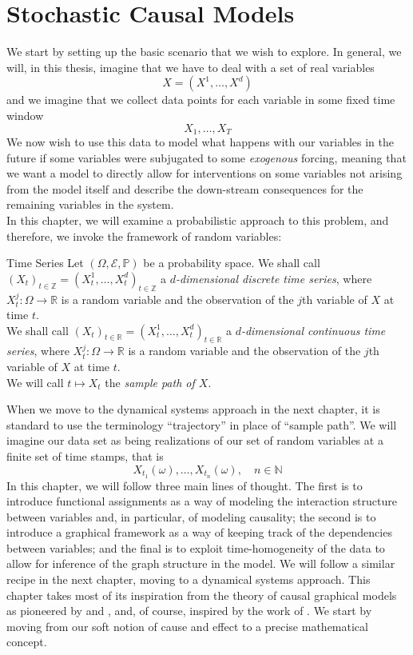 \documentclass[11pt, a4paper]{memoir}
\theoremstyle{break}
\theoremstyle{break}
\theoremstyle{nonumberplain}
\newcommand{\mN}{\mathbb{N}}
\newcommand{\mZ}{\mathbb{Z}}
\newcommand{\mR}{\mathbb{R}}
\newcommand{\mP}{\mathbb{P}}
\begin{document}
\chapter{Stochastic Causal Models}
We start by setting up the basic scenario that we wish to explore. In general, we will, in this thesis, imagine that we have to deal with a set of real variables
$$X=(X^1,\ldots, X^d)$$
and we imagine that we collect data points for each variable in some fixed time window 
$$X_1,\ldots, X_T$$
We now wish to use this data to model what happens with our variables in the future if some variables were subjugated to some \emph{exogenous} forcing, meaning that we want a model to directly allow for interventions on some variables not arising from the model itself and describe the down-stream consequences for the remaining variables in the system.\\[5pt]
In this chapter, we will examine a probabilistic approach to this problem, and therefore, we invoke the framework of random variables:
\begin{mydefinition}{Time Series}
Let $(\Omega,\mathcal{E},\mP)$ be a probability space. We shall call $(X_t)_{t\in \mZ}=(X_t^{1},\ldots,X_{t}^d)_{t\in \mZ}$ a \emph{$d$-dimensional discrete time series}, where $X_t^j:\Omega\to \mR$ is a random variable and the observation of the $j$th variable of $X$ at time $t$.\\[5pt]
We shall call $(X_t)_{t\in \mR}=(X_t^{1},\ldots,X_{t}^d)_{t\in \mR}$ a \emph{$d$-dimensional continuous time series}, where $X_t^j:\Omega\to \mR$ is a random variable and the observation of the $j$th variable of $X$ at time $t$.\\[5pt]
We will call $t\mapsto X_t$ the \emph{sample path of $X$}.
\end{mydefinition}
When we move to the dynamical systems approach in the next chapter, it is standard to use the terminology \enquote{trajectory} in place of \enquote{sample path}. We will imagine our data set as being realizations of our set of random variables at a finite set of time stamps, that is
$$X_{t_1}(\omega),\ldots,X_{t_n}(\omega),\quad n\in \mN$$
In this chapter, we will follow three main lines of thought. The first is to introduce functional assignments as a way of modeling the interaction structure between variables and, in particular, of modeling causality; the second is to introduce a graphical framework as a way of keeping track of the dependencies between variables; and the final is to exploit time-homogeneity of the data to allow for inference of the graph structure in the model. We will follow a similar recipe in the next chapter, moving to a dynamical systems approach. This chapter takes most of its inspiration from the theory of causal graphical models as pioneered by \cite{Spirtes} and \cite{Pearl}, and, of course, inspired by the work of \cite{Steffen}. We start by moving from our soft notion of cause and effect to a precise mathematical concept.
\end{document}

